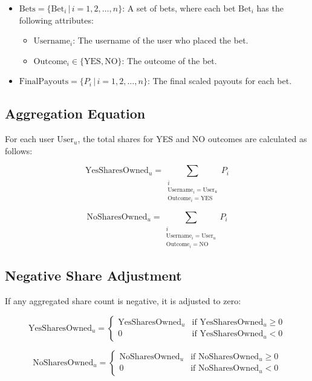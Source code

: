 \documentclass{article}
\begin{document}
\begin{itemize}
    \item \(\text{Bets} = \{ \text{Bet}_i \,|\, i = 1, 2, \dots, n \}\): A set of bets, where each bet \(\text{Bet}_i\) has the following attributes:
    \begin{itemize}
        \item \(\text{Username}_i\): The username of the user who placed the bet.
        \item \(\text{Outcome}_i \in \{\text{YES}, \text{NO}\}\): The outcome of the bet.
    \end{itemize}
    \item \(\text{FinalPayouts} = \{P_i \,|\, i = 1, 2, \dots, n\}\): The final scaled payouts for each bet.
\end{itemize}

\subsection*{Aggregation Equation}

For each user \(\text{User}_u\), the total shares for YES and NO outcomes are calculated as follows:

\[
\text{YesSharesOwned}_u = \sum_{\substack{i \\ \text{Username}_i = \text{User}_u \\ \text{Outcome}_i = \text{YES}}} P_i
\]

\[
\text{NoSharesOwned}_u = \sum_{\substack{i \\ \text{Username}_i = \text{User}_u \\ \text{Outcome}_i = \text{NO}}} P_i
\]

\subsection*{Negative Share Adjustment}

If any aggregated share count is negative, it is adjusted to zero:

\[
\text{YesSharesOwned}_u =
\begin{cases}
\text{YesSharesOwned}_u & \text{if } \text{YesSharesOwned}_u \geq 0 \\
0 & \text{if } \text{YesSharesOwned}_u < 0
\end{cases}
\]

\[
\text{NoSharesOwned}_u =
\begin{cases}
\text{NoSharesOwned}_u & \text{if } \text{NoSharesOwned}_u \geq 0 \\
0 & \text{if } \text{NoSharesOwned}_u < 0
\end{cases}
\]
\end{document}
